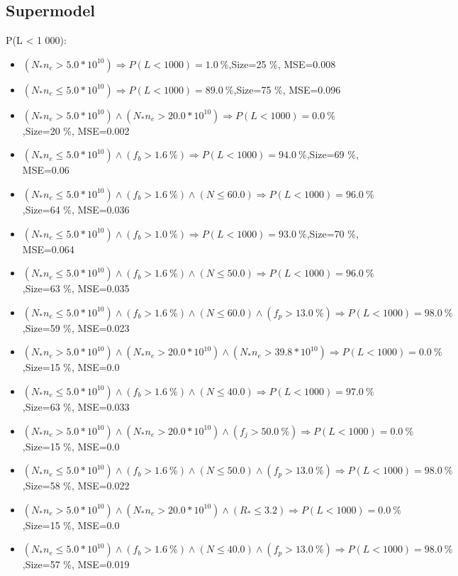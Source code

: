 \documentclass[numbered]{CSL}
\begin{document}
\subsection{Supermodel}
P(L < 1 000):
\begin{itemize}
\item $(N_* n_e > 5.0 * 10^{10}) \Rightarrow P(L < 1 000) = 1.0~\%$,\hfill Size=25 \%, MSE=0.008
\item $(N_* n_e \leq 5.0 * 10^{10}) \Rightarrow P(L < 1 000) = 89.0~\%$,\hfill Size=75 \%, MSE=0.096
\item $(N_* n_e > 5.0 * 10^{10}) \land (N_* n_e > 20.0 * 10^{10}) \Rightarrow P(L < 1 000) = 0.0~\%$,\hfill Size=20 \%, MSE=0.002
\item $(N_* n_e \leq 5.0 * 10^{10}) \land (f_b > 1.6~\%) \Rightarrow P(L < 1 000) = 94.0~\%$,\hfill Size=69 \%, MSE=0.06
\item $(N_* n_e \leq 5.0 * 10^{10}) \land (f_b > 1.6~\%) \land (N \leq 60.0) \Rightarrow P(L < 1 000) = 96.0~\%$,\hfill Size=64 \%, MSE=0.036
\item $(N_* n_e \leq 5.0 * 10^{10}) \land (f_b > 1.0~\%) \Rightarrow P(L < 1 000) = 93.0~\%$,\hfill Size=70 \%, MSE=0.064
\item $(N_* n_e \leq 5.0 * 10^{10}) \land (f_b > 1.6~\%) \land (N \leq 50.0) \Rightarrow P(L < 1 000) = 96.0~\%$,\hfill Size=63 \%, MSE=0.035
\item $(N_* n_e \leq 5.0 * 10^{10}) \land (f_b > 1.6~\%) \land (N \leq 60.0) \land (f_p > 13.0~\%) \Rightarrow P(L < 1 000) = 98.0~\%$,\hfill Size=59 \%, MSE=0.023
\item $(N_* n_e > 5.0 * 10^{10}) \land (N_* n_e > 20.0 * 10^{10}) \land (N_* n_e > 39.8 * 10^{10}) \Rightarrow P(L < 1 000) = 0.0~\%$,\hfill Size=15 \%, MSE=0.0
\item $(N_* n_e \leq 5.0 * 10^{10}) \land (f_b > 1.6~\%) \land (N \leq 40.0) \Rightarrow P(L < 1 000) = 97.0~\%$,\hfill Size=63 \%, MSE=0.033
\item $(N_* n_e > 5.0 * 10^{10}) \land (N_* n_e > 20.0 * 10^{10}) \land (f_j > 50.0~\%) \Rightarrow P(L < 1 000) = 0.0~\%$,\hfill Size=15 \%, MSE=0.0
\item $(N_* n_e \leq 5.0 * 10^{10}) \land (f_b > 1.6~\%) \land (N \leq 50.0) \land (f_p > 13.0~\%) \Rightarrow P(L < 1 000) = 98.0~\%$,\hfill Size=58 \%, MSE=0.022
\item $(N_* n_e > 5.0 * 10^{10}) \land (N_* n_e > 20.0 * 10^{10}) \land (R_* \leq 3.2) \Rightarrow P(L < 1 000) = 0.0~\%$,\hfill Size=15 \%, MSE=0.0
\item $(N_* n_e \leq 5.0 * 10^{10}) \land (f_b > 1.6~\%) \land (N \leq 40.0) \land (f_p > 13.0~\%) \Rightarrow P(L < 1 000) = 98.0~\%$,\hfill Size=57 \%, MSE=0.019

\end{itemize}
\end{document}
